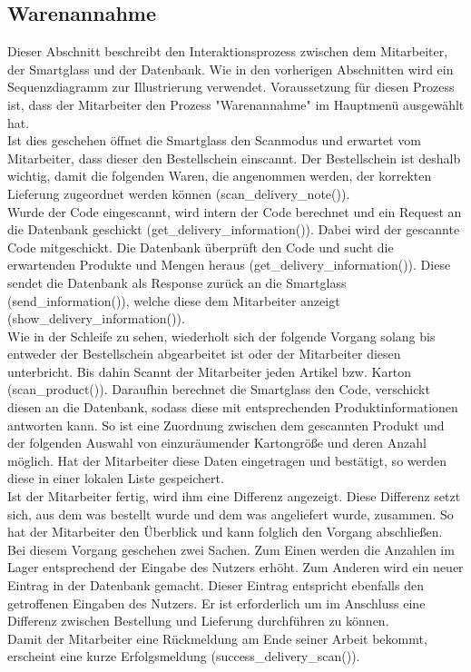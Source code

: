 \subsection{Warenannahme}
Dieser Abschnitt beschreibt den Interaktionsprozess zwischen dem Mitarbeiter, der Smartglass und der Datenbank. Wie in den vorherigen Abschnitten wird ein Sequenzdiagramm zur Illustrierung verwendet. Voraussetzung für diesen Prozess ist, dass der Mitarbeiter den Prozess "Warenannahme" im Hauptmenü ausgewählt hat. 
\\
Ist dies geschehen öffnet die Smartglass den Scanmodus und erwartet vom Mitarbeiter, dass dieser den Bestellschein einscannt. Der Bestellschein ist deshalb wichtig, damit die folgenden Waren, die angenommen werden, der korrekten Lieferung zugeordnet werden können (scan\_delivery\_note()). 
\\
Wurde der Code eingescannt, wird intern der Code berechnet und ein Request an die Datenbank geschickt (get\_delivery\_information()). Dabei wird der gescannte Code mitgeschickt. Die Datenbank überprüft den Code und sucht die erwartenden Produkte und Mengen heraus (get\_delivery\_information()). Diese sendet die Datenbank als Response zurück an die Smartglass (send\_information()), welche diese dem Mitarbeiter anzeigt (show\_delivery\_information()).
\\
Wie in der Schleife zu sehen, wiederholt sich der folgende Vorgang solang bis entweder der Bestellschein abgearbeitet ist oder der Mitarbeiter diesen unterbricht. Bis dahin Scannt der Mitarbeiter jeden Artikel bzw. Karton (scan\_product()). Daraufhin berechnet die Smartglass den Code, verschickt diesen an die Datenbank, sodass diese mit entsprechenden Produktinformationen antworten kann. So ist eine Zuordnung zwischen dem gescannten Produkt und der folgenden Auswahl von einzuräumender Kartongröße und deren Anzahl möglich. Hat der Mitarbeiter diese Daten eingetragen und bestätigt, so werden diese in einer lokalen Liste gespeichert. \\
Ist der Mitarbeiter fertig, wird ihm eine Differenz angezeigt. Diese Differenz setzt sich, aus dem was bestellt wurde und dem was angeliefert wurde, zusammen. So hat der Mitarbeiter den Überblick und kann folglich den Vorgang abschließen. \\
Bei diesem Vorgang geschehen zwei Sachen. Zum Einen werden die Anzahlen im Lager entsprechend der Eingabe des Nutzers erhöht. Zum Anderen wird ein neuer Eintrag in der Datenbank gemacht. Dieser Eintrag entspricht ebenfalls den getroffenen Eingaben des Nutzers. Er ist erforderlich um im Anschluss eine Differenz zwischen Bestellung und Lieferung durchführen zu können.\\
Damit der Mitarbeiter eine Rückmeldung am Ende seiner Arbeit bekommt, erscheint eine kurze Erfolgsmeldung (success\_delivery\_scan()).

